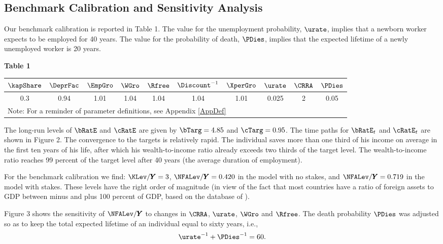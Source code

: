 \documentclass[titlepage]{\econtex}\newcommand{\texname}{cjSOE}
\renewcommand{\GDPLev}{\ensuremath{\pmb{Y}}}
\begin{document}
\subsection{Benchmark Calibration and Sensitivity Analysis}

Our benchmark calibration is reported in Table 1. The value for the unemployment probability, $\urate$, implies that a newborn worker expects to be employed for 40 years. The value for the probability of death, $\PDies$, implies that the expected lifetime of a newly unemployed worker is 20 years.

\medskip

\centerline{\bf Table 1}

\begin{center}
\begin{tabular}{|c|c|c|c|c|c|c|c|c|c|}
  \hline
  $\kapShare$ & $\DeprFac$ & $\EmpGro$ & $\WGro$ & $\Rfree$ & $\Discount^{-1}$ & $\XperGro$ & $\urate$ & $\CRRA$ & $\PDies$ \\ \hline
  0.3 & 0.94 & 1.01 & 1.04 & 1.04 & 1.04 & 1.01 & 0.025 & 2 & 0.05 \\
  \hline
\multicolumn{10}{l}{\small Note: For a reminder of parameter definitions, see Appendix \ref{AppDef}} \\
\end{tabular}
\end{center}

The long-run levels of $\bRatE$ and $\cRatE$ are given by
$\bTarg=4.85$ and $\cTarg=0.95$. The time paths for $\bRatE_{t}$ and $\cRatE_{t}$
are shown in Figure 2. The convergence to the targets is relatively
rapid. The individual saves more than one third of his income on
average in the first ten years of his life, after which his
wealth-to-income ratio already exceeds two thirds of the target
level. The wealth-to-income ratio reaches 99 percent of the target
level after 40 years (the average duration of employment).

For the benchmark calibration we find: $\KLev/\GDPLev=3$, $\NFALev/\GDPLev=0.420$ in the model with no stakes, and $\NFALev/\GDPLev=0.719$ in the model with stakes. These levels have the right order of magnitude (in view of the fact that most countries have a ratio of foreign assets to GDP between minus and plus 100 percent of GDP, based on the database of \cite{lmf:mark2}).

Figure 3 shows the sensitivity of $\NFALev/\GDPLev$ to changes in $\CRRA$, $\urate$, $\WGro$ and $\Rfree$. The death probability $\PDies$ was adjusted so as to keep the total expected lifetime of an individual equal to sixty years, i.e.,
\begin{eqnarray*}
\urate^{-1}+\PDies^{-1}=60.
\end{eqnarray*}
\end{document}
